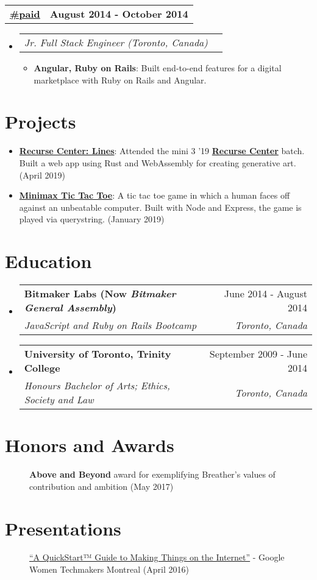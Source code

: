 \documentclass[letterpaper,10.8pt]{article}
\makeatletter
\newcommand{\resumeItem}[2]{
  \item\small{
    \textbf{#1}{: #2 \vspace{-2pt}}
  }
}
\newcommand{\education}[4]{
  \vspace{0pt}\item[]
    \begin{tabular*}{1\textwidth}{l@{\extracolsep{\fill}}r}
      \textbf{#1} & #2 \\
      \textit{\small#3} & \textit{\small #4} \\
    \end{tabular*}\vspace{-4pt}
}
\newcommand{\jobLineItem}[2]{
  \vspace{0pt}\item[]
    \begin{tabular*}{0.98\textwidth}{l@{\extracolsep{\fill}}r}
      \textit{#1} & \textit{\small #2} \\
    \end{tabular*}\vspace{-4pt}
}
\newcommand{\employerTitle}[3]{
  \begin{tabular*}{1\textwidth}{l@{\extracolsep{\fill}}r}
    \href{#1}{\textbf{#2}} & \textbf{#3} \\
  \end{tabular*}\vspace{-4pt}
}
\newcommand{\resumeSubItem}[2]{\resumeItem{#1}{#2}\vspace{-5pt}}
\newcommand{\resumeSubHeadingListStart}{\begin{itemize}[leftmargin=*]}
\newcommand{\educationStart}{\begin{itemize}[leftmargin=0pt]}
\newcommand{\resumeSubHeadingListEnd}{\end{itemize}}
\newcommand{\resumeItemListStart}{\begin{itemize}}
\newcommand{\resumeItemListEnd}{\end{itemize}\vspace{-5pt}}
\makeatother
\begin{document}
    \employerTitle
  {https://hashtagpaid.com}{\#paid}{August 2014 - October 2014}
  \resumeSubHeadingListStart
  \jobLineItem
		{Jr. Full Stack Engineer (Toronto, Canada)}{}
		\resumeItemListStart
      \resumeItem{Angular, Ruby on Rails}
        {Built end-to-end features for a digital marketplace with Ruby on Rails and Angular.}
      \resumeItemListEnd
    \resumeSubHeadingListEnd

\section{Projects}
\resumeSubHeadingListStart
\resumeSubItem{\href{https://github.com/alessbell/lines}{Recurse Center: Lines}}{Attended the mini 3 '19 \href{https://recurse.com}{\textbf{Recurse Center}} batch. Built a web app using Rust and WebAssembly for creating generative art. (April 2019)}
\resumeSubItem{\href{https://github.com/alessbell/wave-tic-tac-toe}{Minimax Tic Tac Toe}}{A tic tac toe game in which a human faces off against an unbeatable computer. Built with Node and Express, the game is played via querystring. (January 2019)}
\vspace{5px}
\resumeSubHeadingListEnd

\section{Education}
  \educationStart
    \education
      {Bitmaker Labs (Now \textit{Bitmaker General Assembly})}{June 2014 - August 2014}
      {JavaScript and Ruby on Rails Bootcamp}{Toronto, Canada}
    \education
      {University of Toronto, Trinity College}{September 2009 - June 2014}
      {Honours Bachelor of Arts; Ethics, Society and Law}{Toronto, Canada}
    \vspace{-4px}
  \resumeSubHeadingListEnd

\section{Honors and Awards}
\begin{description}
\item[] {\textbf{Above and Beyond} award for exemplifying Breather’s values of contribution and ambition (May 2017)}
\vspace{-2px}
\end{description}

\section{Presentations}
\begin{description}
\item[] {\href{https://www.youtube.com/watch?v=6EHbfAmA_0c}{“A QuickStart™ Guide to Making Things on the Internet”} - Google Women Techmakers Montreal (April 2016)}
\end{description}

\end{document}
